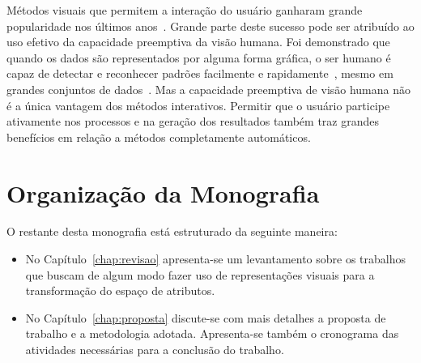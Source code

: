 Métodos visuais que permitem a interação do usuário ganharam     grande popularidade nos últimos anos~\cite{State2012}.
Grande parte deste sucesso pode ser atribuído ao uso efetivo da  capacidade preemptiva da visão humana.
Foi demonstrado que quando os dados são representados por alguma forma gráfica, o ser humano é capaz de detectar e reconhecer     padrões facilmente e rapidamente~\cite{Healey1995}, mesmo em     grandes conjuntos de dados~\cite{Fodor2002}.
Mas a capacidade preemptiva de visão humana não é a única        vantagem dos métodos interativos. Permitir que o usuário         participe ativamente nos processos e na geração dos resultados   também traz grandes benefícios em relação a métodos              completamente automáticos.



\section{Organização da Monografia}

O restante desta monografia está estruturado da seguinte maneira:

\begin{itemize}
        
  \item No Capítulo~\ref{chap:revisao} apresenta-se um levantamento sobre os trabalhos que buscam de algum modo fazer uso de representações visuais para a transformação do espaço de atributos. 

  \item No Capítulo~\ref{chap:proposta} discute-se com mais detalhes a proposta de trabalho e a metodologia adotada. Apresenta-se também o cronograma das atividades necessárias para a conclusão do trabalho.

\end{itemize}
